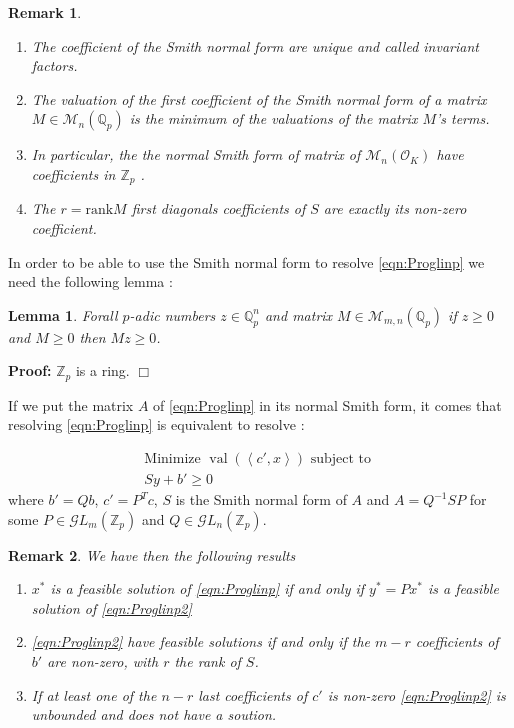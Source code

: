\documentclass[a4paper,12pt]{article}
\newenvironment{proof}{\hbox{}\vspace{-0.5cm} {\bf Proof:}}{\hfill $\Box$ \\}
\newtheorem{lemma}{Lemma}
\newtheorem{remark}{Remark}
\DeclareMathOperator{\val}{val}
\def\QQ{\ensuremath{\mathbb{Q}}}
\def\ZZ{\ensuremath{\mathbb{Z}}}
\newcommand{\OK}{\mathcal{O}_K}
\begin{document}
\begin{remark}
	\begin{enumerate}%
		\item The coefficient of the Smith normal form are unique and called \textit{invariant factors}.
		\item The valuation of the first coefficient of the Smith normal form of a matrix $M \in \mathcal{M}_n \left( \QQ_p \right) $ is the minimum of the valuations of the matrix $M$'s terms.
		\item In particular, the the normal Smith form of matrix of $\mathcal{M}_n \left( \OK \right) $ have coefficients in $\ZZ_p$ .
		\item The $r = \text{rank} M$ first diagonals coefficients of $S$ are exactly its non-zero coefficient.
	\end{enumerate}
	
\end{remark}

In order to be able to use the Smith normal form to resolve \ref{eqn:Proglinp} we need the following lemma :

\begin{lemma}
	Forall $p$-adic numbers $z \in \QQ_p ^n$ and matrix $M \in \mathcal{M}_{m,n}\left( \QQ_p  \right)  $ if $z\ge 0$ and $M\ge 0$ then $Mz\ge 0$.  
\end{lemma}
\begin{proof}
	$\ZZ_p$ is a ring.
\end{proof}


If we put the matrix $A$ of \ref{eqn:Proglinp} in its normal Smith form, it comes that resolving \ref{eqn:Proglinp} is equivalent to resolve :    


\begin{equation}
	\tag{PLp'}
	\begin{matrix}
		\text{Minimize } \val\left(\left<c',x \right>\right) \text{ subject to }\\
		Sy + b' \ge 0
	\end{matrix}
	\label{eqn:Proglinp2}
\end{equation}
where $b' = Qb$, $c' = P^Tc$, $S$ is the Smith normal form of $A$ and $A = Q^{-1} S P$ for some $P \in \mathcal{G}L_m\left( \ZZ_p \right)$ and $ Q \in \mathcal{G}L_n\left( \ZZ_p \right)$.

\begin{remark}
	
	We have then the following results
	\begin{enumerate}
		\item $x^*$ is a feasible solution of \ref{eqn:Proglinp} if and only if $y^* = P x^*$ is a feasible solution of \ref{eqn:Proglinp2}
		\item \ref{eqn:Proglinp2} have feasible solutions if and only if the $m-r$ coefficients of $b'$ are non-zero, with $r$ the rank of $S$.
		\item If at least one of the $n-r$ last coefficients of $c'$ is non-zero \ref{eqn:Proglinp2} is unbounded and does not have a soution.
	\end{enumerate}
	
\end{remark}
\end{document}
